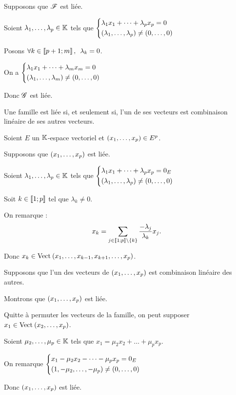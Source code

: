 \begin{dem}[4]
Supposons que \(\mathscr{F}\) est liée.

Soient \(\lambda_1,\dots,\lambda_p\in\mathbb{K}\) tels que \(\begin{dcases}
\lambda_1x_1+\dots+\lambda_px_p=0 \\
\left(\lambda_1,\dots,\lambda_p\right)\not=\left(0,\dots,0\right)
\end{dcases}\)

Posons \(\quantifs{\forall k\in\interventierii{p+1}{m}}\lambda_k=0\).

On a \(\begin{dcases}
\lambda_1x_1+\dots+\lambda_mx_m=0 \\
\left(\lambda_1,\dots,\lambda_m\right)\not=\left(0,\dots,0\right)
\end{dcases}\)

Donc \(\mathscr{G}\) est liée.
\end{dem}

\begin{prop}
Une famille est liée si, et seulement si, l'un de ses vecteurs est combinaison linéaire de ses autres vecteurs.
\end{prop}

\begin{dem}
Soient \(E\) un \(\mathbb{K}\)-espace vectoriel et \(\left(x_1,\dots,x_p\right)\in E^p\).

\impdir

Supposons que \(\left(x_1,\dots,x_p\right)\) est liée.

Soient \(\lambda_1,\dots,\lambda_p\in\mathbb{K}\) tels que \(\begin{dcases}
\lambda_1x_1+\dots+\lambda_px_p=0_E \\
\left(\lambda_1,\dots,\lambda_p\right)\not=\left(0,\dots,0\right)
\end{dcases}\)

Soit \(k\in\left\llbracket1;p\right\rrbracket\) tel que \(\lambda_k\not=0\).

On remarque : \[x_k=\sum_{j\in\left\llbracket1;p\right\rrbracket\setminus\left\lbrace k\right\rbrace}\dfrac{-\lambda_j}{\lambda_k}x_j.\]

Donc \(x_k\in\Vect{x_1,\dots,x_{k-1},x_{k+1},\dots,x_p}\).

\imprec

Supposons que l'un des vecteurs de \(\left(x_1,\dots,x_p\right)\) est combinaison linéaire des autres.

Montrons que \(\left(x_1,\dots,x_p\right)\) est liée.

Quitte à permuter les vecteurs de la famille, on peut supposer \(x_1\in\Vect{x_2,\dots,x_p}\).

Soient \(\mu_2,\dots,\mu_p\in\mathbb{K}\) tels que \(x_1=\mu_2x_2+\dots+\mu_px_p\).

On remarque \(\begin{dcases}
x_1-\mu_2x_2-\dots-\mu_px_p=0_E \\
\left(1,-\mu_2,\dots,-\mu_p\right)\not=\left(0,\dots,0\right)
\end{dcases}\)

Donc \(\left(x_1,\dots,x_p\right)\) est liée.
\end{dem}

